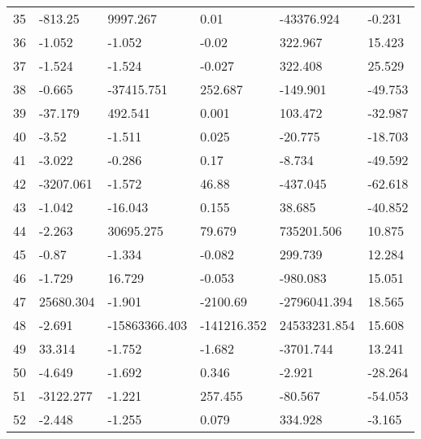 \documentclass[11pt]{article}
\begin{document}
\begin{center}
\begin{longtable}{llllll}
        35  & -813.25    & 9997.267               & 0.01              & -43376.924         & -0.231   \\
        36  & -1.052     & -1.052                 & -0.02             & 322.967            & 15.423   \\
        37  & -1.524     & -1.524                 & -0.027            & 322.408            & 25.529   \\
        38  & -0.665     & -37415.751             & 252.687           & -149.901           & -49.753  \\
        39  & -37.179    & 492.541                & 0.001             & 103.472            & -32.987  \\
        40  & -3.52      & -1.511                 & 0.025             & -20.775            & -18.703  \\
        41  & -3.022     & -0.286                 & 0.17              & -8.734             & -49.592  \\
        42  & -3207.061  & -1.572                 & 46.88             & -437.045           & -62.618  \\
        43  & -1.042     & -16.043                & 0.155             & 38.685             & -40.852  \\
        44  & -2.263     & 30695.275              & 79.679            & 735201.506         & 10.875   \\
        45  & -0.87      & -1.334                 & -0.082            & 299.739            & 12.284   \\
        46  & -1.729     & 16.729                 & -0.053            & -980.083           & 15.051   \\
        47  & 25680.304  & -1.901                 & -2100.69          & -2796041.394       & 18.565   \\
        48  & -2.691     & -15863366.403          & -141216.352       & 24533231.854       & 15.608   \\
        49  & 33.314     & -1.752                 & -1.682            & -3701.744          & 13.241   \\
        50  & -4.649     & -1.692                 & 0.346             & -2.921             & -28.264  \\
        51  & -3122.277  & -1.221                 & 257.455           & -80.567            & -54.053  \\
        52  & -2.448     & -1.255                 & 0.079             & 334.928            & -3.165   \\

\end{longtable}
\end{center}
\end{document}
